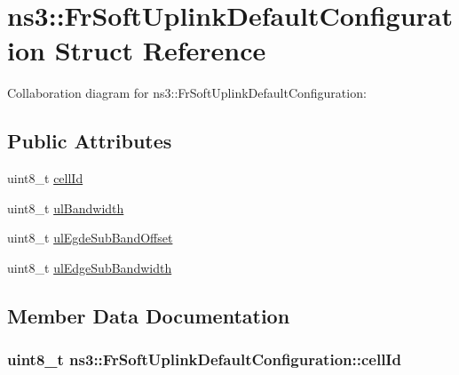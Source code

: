 \hypertarget{structns3_1_1FrSoftUplinkDefaultConfiguration}{}\section{ns3\+:\+:Fr\+Soft\+Uplink\+Default\+Configuration Struct Reference}
\label{structns3_1_1FrSoftUplinkDefaultConfiguration}


Collaboration diagram for ns3\+:\+:Fr\+Soft\+Uplink\+Default\+Configuration\+:
\subsection*{Public Attributes}
\begin{DoxyCompactItemize}
\item 
uint8\+\_\+t \hyperlink{structns3_1_1FrSoftUplinkDefaultConfiguration_ad15d0475214a7285b86b370802915aed}{cell\+Id}
\item 
uint8\+\_\+t \hyperlink{structns3_1_1FrSoftUplinkDefaultConfiguration_afff1a486f03f1846f2cb0d6460113339}{ul\+Bandwidth}
\item 
uint8\+\_\+t \hyperlink{structns3_1_1FrSoftUplinkDefaultConfiguration_a30c213b4f59caf0cefcecbb7528bf100}{ul\+Egde\+Sub\+Band\+Offset}
\item 
uint8\+\_\+t \hyperlink{structns3_1_1FrSoftUplinkDefaultConfiguration_a9a9a3081265e07a57ae0a8aa0c66f8d0}{ul\+Edge\+Sub\+Bandwidth}
\end{DoxyCompactItemize}


\subsection{Member Data Documentation}
\subsubsection[{\texorpdfstring{cell\+Id}{cellId}}]{\setlength{\rightskip}{0pt plus 5cm}uint8\+\_\+t ns3\+::\+Fr\+Soft\+Uplink\+Default\+Configuration\+::cell\+Id}\hypertarget{structns3_1_1FrSoftUplinkDefaultConfiguration_ad15d0475214a7285b86b370802915aed}{}\label{structns3_1_1FrSoftUplinkDefaultConfiguration_ad15d0475214a7285b86b370802915aed}
